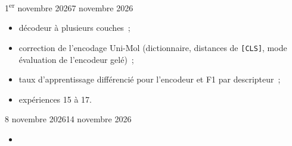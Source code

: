\begin{fichesuivi}{1\textsuperscript{er} novembre 2026}{7 novembre 2026}

   \begin{travaileffectue}
      \begin{itemize}
         \item décodeur à plusieurs couches~;
         \item correction de l'encodage Uni-Mol (dictionnaire, distances de \texttt{[CLS]}, mode évaluation de l'encodeur gelé)~;
         \item taux d'apprentissage différencié pour l'encodeur et F1 par descripteur~;
         \item expériences 15 à 17.
      \end{itemize}
   \end{travaileffectue}

   \begin{travailnoneffectue}
   \end{travailnoneffectue}

   \begin{echange}
   \end{echange}

   \begin{planification}
   \end{planification}
\end{fichesuivi}

\begin{fichesuivi}{8 novembre 2026}{14 novembre 2026}

   \begin{travaileffectue}
      \begin{itemize}
         \item {}
      \end{itemize}
   \end{travaileffectue}

   \begin{travailnoneffectue}
   \end{travailnoneffectue}

   \begin{echange}
   \end{echange}

   \begin{planification}
   \end{planification}
\end{fichesuivi}

